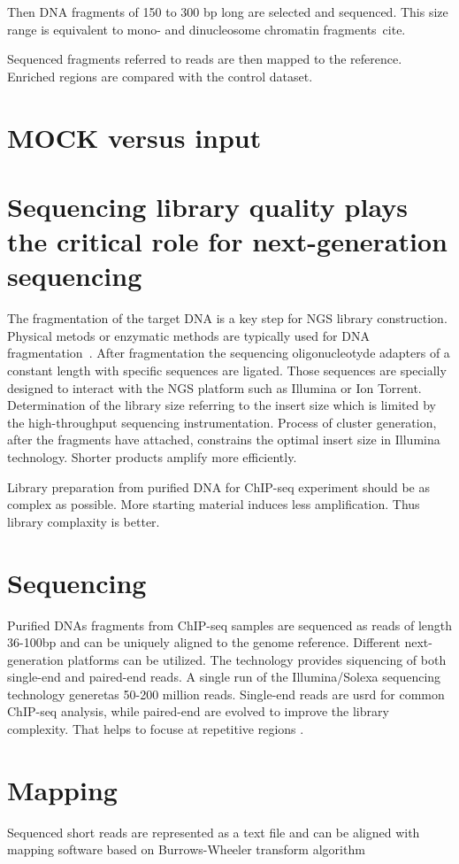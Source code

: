 Then DNA fragments of 150 to 300 bp long are selected and sequenced.
This size range is equivalent to mono- and dinucleosome chromatin fragments~cite{}.



Sequenced fragments referred to reads are then mapped to the reference. 
Enriched regions are compared with the control dataset.










\section{MOCK versus input}


\section{Sequencing library quality plays the critical role for next-generation sequencing}
The fragmentation of the target DNA is a key step for NGS library construction.
Physical metods or enzymatic methods are typically used for DNA fragmentation~\cite{}.
After fragmentation the sequencing oligonucleotyde adapters of a constant length with specific sequences are ligated.
Those sequences are specially designed to interact with the NGS platform such as Illumina or Ion Torrent.
Determination of the library size referring to the insert size which is limited by the high-throughput sequencing instrumentation.
Process of cluster generation, after the fragments have attached, constrains the optimal insert size in Illumina technology.
Shorter products amplify more efficiently.

Library preparation from purified DNA for ChIP-seq experiment should be as complex as possible.
More starting material induces less amplification.
Thus library complaxity is better.


\section{Sequencing}
Purified DNAs fragments from ChIP-seq samples are sequenced as reads of length 36-100bp and can be uniquely aligned to the genome reference.
Different next-generation platforms can be utilized.
The technology provides siquencing of both single-end and paired-end reads.
A single run of the Illumina/Solexa sequencing technology generetas 50-200 million reads\cite{park2009chip}.
Single-end reads are usrd for common ChIP-seq analysis, while paired-end are evolved to improve the library complexity.
That helps to focuse at repetitive regions \cite{chen2012systematic}.

\section{Mapping}
Sequenced short reads are represented as a text file and can be aligned with mapping software based on Burrows-Wheeler transform algorithm \cite{li2009fast} \cite{siren2014indexing}
